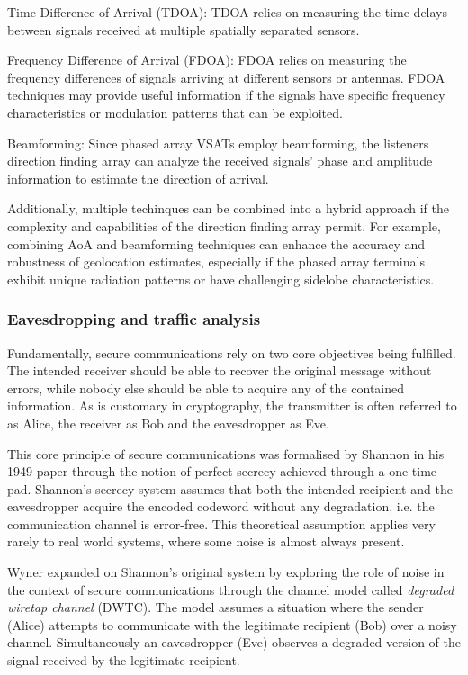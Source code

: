\documentclass[english, 12pt, a4paper, elec, utf8, a-1b, online]{aaltothesis}
\begin{document}
Time Difference of Arrival (TDOA): TDOA relies on measuring the time delays between signals received at multiple spatially separated sensors.

Frequency Difference of Arrival (FDOA): FDOA relies on measuring the frequency differences of signals arriving at different sensors or antennas.
FDOA techniques may provide useful information if the signals have specific frequency characteristics or modulation patterns that can be exploited.

Beamforming: Since phased array VSATs employ beamforming, the listeners direction finding array can analyze the received signals' phase and amplitude information to estimate the direction of arrival.

Additionally, multiple techinques can be combined into a hybrid approach if the complexity and capabilities of the direction finding array permit.
For example, combining AoA and beamforming techniques can enhance the accuracy and robustness of geolocation estimates, especially if the phased array terminals exhibit unique radiation patterns or have challenging sidelobe characteristics.

\subsubsection{Eavesdropping and traffic analysis}
Fundamentally, secure communications rely on two core objectives being fulfilled.
The intended receiver should be able to recover the original message without errors, while nobody else should be able to acquire any of the contained information.
As is customary in cryptography, the transmitter is often referred to as Alice, the receiver as Bob and the eavesdropper as Eve.
\cite{bloch2011physical}

This core principle of secure communications was formalised by Shannon \cite{shannon1949communication} in his 1949 paper through the notion of perfect secrecy achieved through a one-time pad.
Shannon's secrecy system assumes that both the intended recipient and the eavesdropper acquire the encoded codeword without any degradation, i.e.
the communication channel is error-free.
This theoretical assumption applies very rarely to real world systems, where some noise is almost always present.
\cite{bloch2011physical}

Wyner \cite{wyner1975thewiretap} expanded on Shannon's original system by exploring the role of noise in the context of secure communications through the channel model called \textit{degraded wiretap channel} (DWTC).
The model assumes a situation where the sender (Alice) attempts to communicate with the legitimate recipient (Bob) over a noisy channel.
Simultaneously an eavesdropper (Eve) observes a degraded version of the signal received by the legitimate recipient.
\cite{barros2006secrecy}
\end{document}
